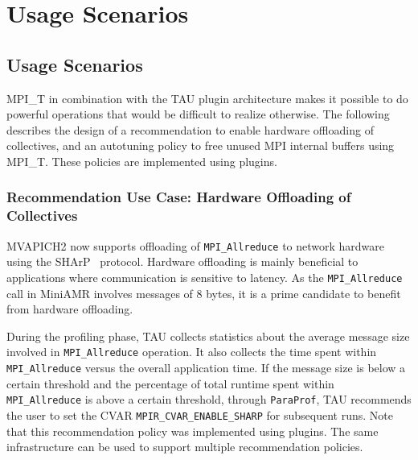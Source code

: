 \chapter{Usage Scenarios}
\section{Usage Scenarios}
MPI\_T in combination with the TAU plugin architecture makes it possible to do powerful operations that would be difficult to realize otherwise. The following describes the design of a recommendation to enable hardware offloading of collectives, and an autotuning policy to free unused MPI internal buffers using MPI\_T. These policies are implemented using plugins.
\subsection{Recommendation Use Case: Hardware Offloading of Collectives}
MVAPICH2 now supports offloading of \verb+MPI_Allreduce+ to network hardware using the SHArP~\cite{SHARP} protocol. Hardware offloading is mainly beneficial to applications where communication is sensitive to latency. As the \verb+MPI_Allreduce+ call in MiniAMR involves messages of 8 bytes, it is a prime candidate to benefit from hardware offloading. \par
During the profiling phase, TAU collects statistics about the average message size involved in \verb+MPI_Allreduce+ operation. It also collects the time spent within \verb+MPI_Allreduce+ versus the overall application time. If the message size is below a certain threshold and the percentage of total runtime spent within \verb+MPI_Allreduce+ is above a certain threshold, through \verb+ParaProf+, TAU recommends the user to set the CVAR \verb+MPIR_CVAR_ENABLE_SHARP+ for subsequent runs. Note that this recommendation policy was implemented using plugins. The same infrastructure can be used to support multiple recommendation policies.
